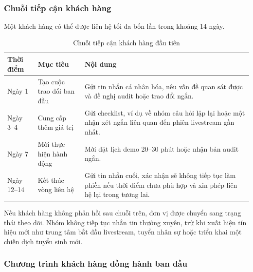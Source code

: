 \subsubsection{Chuỗi tiếp cận khách hàng}

Một khách hàng có thể được liên hệ tối đa bốn lần trong khoảng 14 ngày.

\begin{table}[htbp]
    \centering
    \caption{Chuỗi tiếp cận khách hàng đầu tiên}
    \label{tab:first-customer-outreach-sequence}
    \begin{tabular}{
        p{}
        p{}
        p{}
    }
        \hline
        \textbf{Thời điểm}
        & \textbf{Mục tiêu}
        & \textbf{Nội dung} \\
        \hline

        Ngày 1
        &
        Tạo cuộc trao đổi ban đầu
        &
        Gửi tin nhắn cá nhân hóa, nêu vấn đề quan sát được và đề nghị audit hoặc trao đổi ngắn. \\

        \hline

        Ngày 3--4
        &
        Cung cấp thêm giá trị
        &
        Gửi checklist, ví dụ về nhóm câu hỏi lặp lại hoặc một nhận xét ngắn liên quan đến phiên livestream gần nhất. \\

        \hline

        Ngày 7
        &
        Mời thực hiện hành động
        &
        Mời đặt lịch demo 20--30 phút hoặc nhận bản audit ngắn. \\

        \hline

        Ngày 12--14
        &
        Kết thúc vòng liên hệ
        &
        Gửi tin nhắn cuối, xác nhận sẽ không tiếp tục làm phiền nếu thời điểm chưa phù hợp và xin phép liên hệ lại trong tương lai. \\

        \hline
    \end{tabular}
\end{table}

Nếu khách hàng không phản hồi sau chuỗi trên, đơn vị được chuyển sang trạng thái theo dõi. Nhóm không tiếp tục nhắn tin thường xuyên, trừ khi xuất hiện tín hiệu mới như trung tâm bắt đầu livestream, tuyển nhân sự hoặc triển khai một chiến dịch tuyển sinh mới.

\subsubsection{Chương trình khách hàng đồng hành ban đầu}

